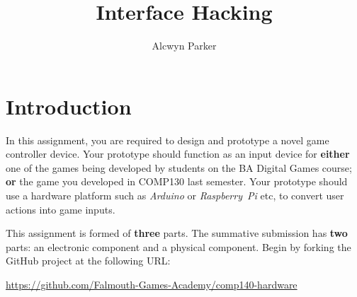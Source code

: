 \documentclass{../fal_assignment}
\title{Interface Hacking}
\author{Alcwyn Parker}
\begin{document}
\maketitle
%    
\section*{Introduction}

In this assignment, you are required to design and prototype a novel game controller device.
Your prototype should function as an input device for \textbf{either}
one of the games being developed by students on the BA Digital Games course; \textbf{or}
the game you developed in COMP130 last semester.
Your prototype should use a hardware platform such as \emph{Arduino} or \emph{Raspberry~Pi} etc,
to convert user actions into game inputs.


This assignment is formed of \textbf{three} parts.
The summative submission has \textbf{two} parts: an electronic component and a physical component.
Begin by forking the GitHub project at the following URL:
\begin{center}
\url{https://github.com/Falmouth-Games-Academy/comp140-hardware}
\end{center}
\end{document}
